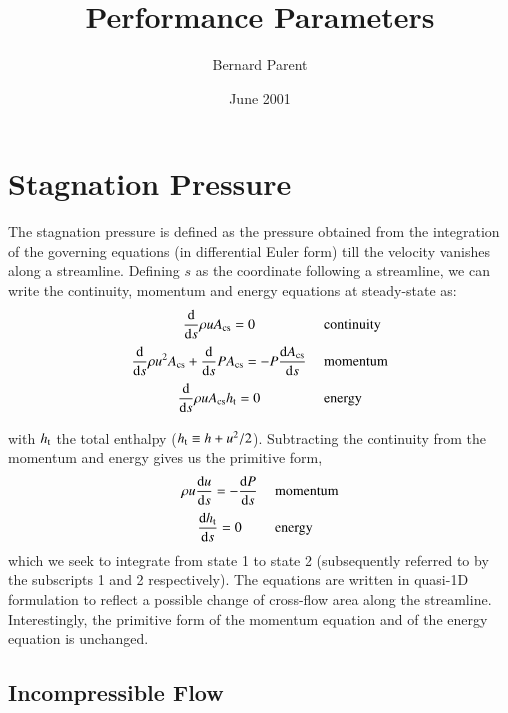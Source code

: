 \documentclass{warpdoc}
\author{
  Bernard Parent
}
\title{
  Performance Parameters
}
\date{
  June 2001
}
\numberwithin{equation}{section}
\newcommand{\alb}{\vspace{0.2cm}\\} %
\newcommand{\mfd}{\displaystyle}
\newcommand{\ordi}{{\rm d}}
\newcommand{\Acs}{A_{\rm cs}}
\newcommand{\bigfrac}{\mfd\frac}
\begin{document}
  \pagestyle{headings}
  \setcounter{page}{1}
  \makewarpdoctitle
  \tableofcontents



\section{Stagnation Pressure}


The stagnation pressure is defined as the pressure obtained from the integration
of the governing equations (in differential Euler form)
till the velocity vanishes along a streamline. Defining $s$ as
the coordinate following a streamline, we can write the continuity,
momentum and energy equations at steady-state as:
%
\begin{displaymath}
 \begin{array}{c@{~~~~~}l}
  \bigfrac{\ordi }{\ordi s}\rho  u \Acs =0 & {\rm continuity}\alb
  \bigfrac{\ordi }{\ordi s}\rho u^2 \Acs+\bigfrac{\ordi }{\ordi s} P \Acs
     =-P \bigfrac{\ordi \Acs}{\ordi s} & {\rm momentum}\alb
  \bigfrac{\ordi }{\ordi s}\rho  u \Acs h_{\rm t} =0 & {\rm energy}\alb
 \end{array}
\end{displaymath}
%
with $h_{\rm t}$ the total enthalpy ($h_{\rm t}\equiv h + u^2/2$). Subtracting the continuity
from the momentum and energy gives us the primitive form,
%
\begin{displaymath}
 \begin{array}{c@{~~~~~}l}
  \rho u \bigfrac{\ordi u}{\ordi s} =-\bigfrac{\ordi P}{\ordi s} & {\rm momentum}\alb
  \bigfrac{\ordi h_{\rm t}}{\ordi s} =0 & {\rm energy}
 \end{array}
\end{displaymath}
%
which we seek to integrate from state 1 to state 2
(subsequently referred to by the subscripts 1 and 2 respectively).
The equations are written
in quasi-1D formulation to reflect a possible change of cross-flow
area along the streamline. Interestingly, the primitive form of the momentum
equation and of the energy equation is unchanged.


\subsection{Incompressible Flow}
\end{document}
